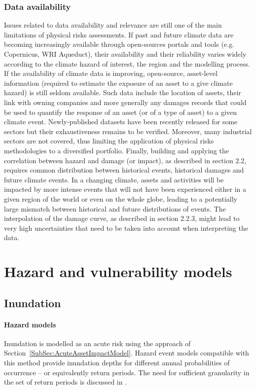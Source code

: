 \documentclass[a4paper,11pt]{extarticle} %
\begin{document}
{\subsubsection{Data availability}
Issues related to data availability and relevance are still one of the main limitations of physical risks assessments. If past and future climate data are becoming increasingly available through open-sources portals and tools (e.g. Copernicus, WRI Aqueduct), their availability and their reliability varies widely according to the climate hazard of interest, the region and the modelling process. If the availability of climate data is improving, open-source, asset-level information (required to estimate the exposure of an asset to a give climate hazard) is still seldom available. Such data include the location of assets, their link with owning companies and more generally any damages records that could be used to quantify the response of an asset (or of a type of asset) to a given climate event. Newly-published datasets have been recently released for some sectors but their exhaustiveness remains to be verified. Moreover, many industrial sectors are not covered, thus limiting the application of physical risks methodologies to a diversified portfolio.
Finally, building and applying the correlation between hazard and damage (or impact), as described in section 2.2, requires common distribution between historical events, historical damages and future climate events. In a changing climate, assets and activities will be impacted by more intense events that will not have been experienced either in a given region of the world or even on the
whole globe, leading to a potentially large mismatch between historical and future distributions of events. The interpolation of the damage curve, as described in section 2.2.3, might lead to very high uncertainties that need to be taken into account when interpreting the data.





\section{Hazard and vulnerability models}

\subsection{Inundation}
\paragraph{Hazard models}
Inundation is modelled as an acute risk using the approach of Section~\ref{SubSec:AcuteAssetImpactModel}. Hazard event models compatible with this method provide inundation depths for different annual probabilities of occurrence -- or equivalently return periods. The need for sufficient granularity in the set of return periods is discussed in \cite{WardEtAl:2011}. 

}
\end{document}
